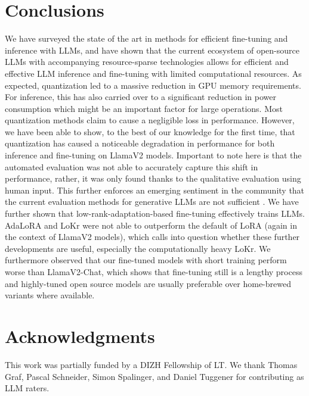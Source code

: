 \documentclass[conference]{IEEEtran}
\begin{document}
\section{Conclusions}
\label{sec:conclusions}
We have surveyed the state of the art in methods for efficient fine-tuning and inference with LLMs, and have shown that the current ecosystem of open-source LLMs with accompanying resource-sparse technologies allows for efficient and effective LLM inference and fine-tuning with limited computational resources. As expected, quantization led to a massive reduction in GPU memory requirements. For inference, this has also carried over to a significant reduction in power consumption which might be an important factor for large operations. Most quantization methods claim to cause a negligible loss in performance. However, we have been able to show, to the best of our knowledge for the first time, that quantization has caused a noticeable degradation in performance for both inference and fine-tuning on LlamaV2 models. Important to note here is that the automated evaluation was not able to accurately capture this shift in performance, rather, it was only found thanks to the qualitative evaluation using human input. This further enforces an emerging sentiment in the community that the current evaluation methods for generative LLMs are not sufficient \cite{deriu-etal-2022-probing}. 
We have further shown that low-rank-adaptation-based fine-tuning effectively trains LLMs. AdaLoRA and LoKr were not able to outperform the default of LoRA (again in the context of LlamaV2 models), which calls into question whether these further developments are useful, especially the computationally heavy LoKr. We furthermore observed that our fine-tuned models with short training perform worse than LlamaV2-Chat, which shows that fine-tuning still is a lengthy process and highly-tuned open source models are usually preferable over home-brewed variants where available. 

\small
\section*{Acknowledgments}
This work was partially funded by a DIZH Fellowship of LT. We thank Thomas Graf, Pascal Schneider, Simon Spalinger, and Daniel Tuggener for contributing as LLM raters.
\normalsize


%
\end{document}
